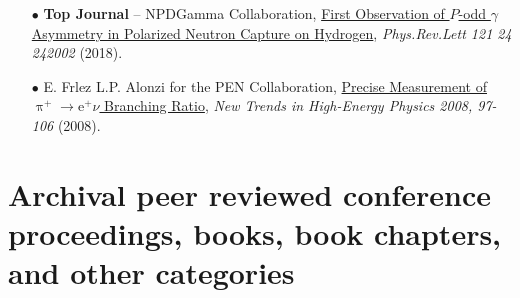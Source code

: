 \documentclass{article}[10pt]
\begin{document}
\begin{itemize}
\item [$\bullet$] {\bf \LARGE Top Journal} -- NPDGamma Collaboration, \href{https://inspirehep.net/literature/1683923}{First Observation of $P$-odd $\gamma$ Asymmetry in Polarized Neutron Capture on Hydrogen}, \emph{Phys.Rev.Lett 121 24 242002} (2018).

\item [$\bullet$] E. Frlez L.P. Alonzi for the PEN Collaboration, \href{https://inspirehep.net/literature/805323}{Precise Measurement of $\uppi^{+}\rightarrow\mathrm{e}^{+}\nu$ Branching Ratio}, \emph{New Trends in High-Energy Physics 2008, 97-106} (2008).


\end{itemize}








\section*{Archival peer reviewed conference proceedings, books, book chapters, and other categories}
\end{document}
